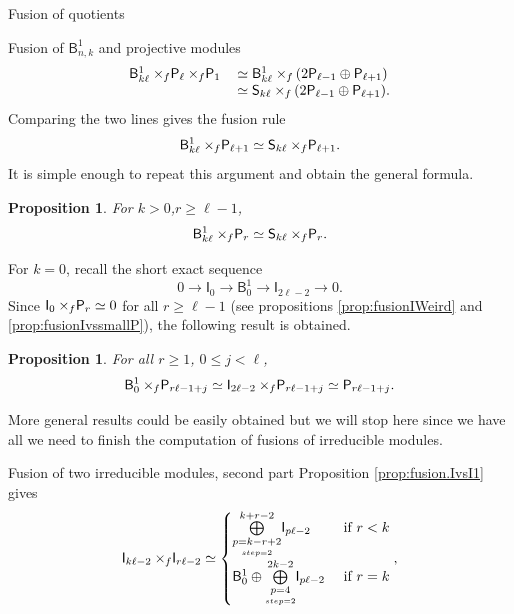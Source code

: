 \documentclass[reqno]{amsart}
\newtheorem{Prop}[Thm]{Proposition}
\newcommand{\ds}[1]{\mathsf S_{#1}}
\newcommand{\dl}[1]{\mathsf I_{#1}}
\newcommand{\dP}[1]{\mathsf P_{#1}}
\newcommand{\xf}{\times\hspace{-0.27em}_f}
\newcommand{\B}[2]{\mathsf{B}^{#1}_{#2}}
\newcommand{\lc}{\ell}
\begin{document}
\begin{section}{Fusion of quotients}
\begin{subsection}{Fusion of $\B{1}{n,k}$ and projective modules}
\begin{equation*}
\begin{tabular}{r l}
$\B{1}{k \lc} \xf \dP{\lc}\xf \dP{1} $&$\simeq \B{1}{k\lc} \xf \left(2\dP{\lc -1} \oplus \dP{\lc +1}\right)$\\
& $\simeq \ds{k \lc} \xf \left(2\dP{\lc -1} \oplus \dP{\lc +1} \right)$.
\end{tabular}
\end{equation*}
Comparing the two lines gives the fusion rule
\begin{equation*}
\B{1}{k \lc} \xf \dP{\lc+1} \simeq \ds{k \lc } \xf \dP{\lc+1}.
\end{equation*}
It is simple enough to repeat this argument and obtain the general formula.
\begin{Prop}\label{prop:fusion.B1vsP}
For $k>0$,$r\geq \lc-1$,
\begin{equation}
\B{1}{k \lc} \xf \dP{r} \simeq \ds{k \lc} \xf \dP{r}.
\end{equation}
\end{Prop}
For $k=0$, recall  the short exact sequence
\begin{equation}
0 \longrightarrow \dl{0} \longrightarrow \B{1}{0} \longrightarrow \dl{2\lc -2} \longrightarrow 0.
\end{equation}
Since $\dl{0} \xf \dP{r} \simeq 0$ for all $r\geq \lc -1$ (see propositions \ref{prop:fusionIWeird} and \ref{prop:fusionIvssmallP}), the following result is obtained.
\begin{Prop}
For all $r\geq 1$, $0\leq j< \lc $,
\begin{equation}
\B{1}{0} \xf \dP{r\lc -1 +j} \simeq \dl{2\lc -2} \xf \dP{r \lc -1 +j} \simeq \dP{r \lc -1 +j}.
\end{equation}
\end{Prop}
More general results could be easily obtained but we will stop here since we have all we need to finish the computation of fusions of irreducible modules.
\end{subsection}
\begin{subsection}{Fusion of two irreducible modules, second part}\label{sec:fusionIvsIfinal}
Proposition \ref{prop:fusion.IvsI1} gives
\begin{equation*}
\dl{k\lc -2} \xf \dl{r \lc -2} \simeq \begin{cases}
\overset{k+r-2}{\underset{\underset{step=2}{p=k-r+2}}{\bigoplus}}\dl{p \lc -2} & \text{ if } r < k \\
\B{1}{0} \oplus \overset{2k-2}{\underset{\underset{step=2}{p=4}}{\bigoplus}}\dl{p \lc -2} & \text{ if } r=k
\end{cases},

\end{equation*}
\end{subsection}
\end{section}
\end{document}
